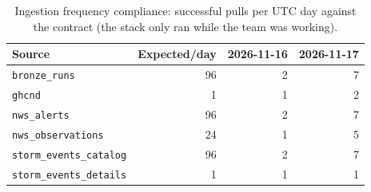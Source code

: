 \begin{table}[H]\centering\footnotesize
\caption{Ingestion frequency compliance: successful pulls per UTC day against the contract (the stack only ran while the team was working).}\label{tab:goving}
\begin{tabular}{@{}lrrr@{}}\toprule
Source & Expected/day & 2026-11-16 & 2026-11-17\\\midrule
\texttt{bronze\_runs} & 96 & 2 & 7\\
\texttt{ghcnd} & 1 & 1 & 2\\
\texttt{nws\_alerts} & 96 & 2 & 7\\
\texttt{nws\_observations} & 24 & 1 & 5\\
\texttt{storm\_events\_catalog} & 96 & 2 & 7\\
\texttt{storm\_events\_details} & 1 & 1 & 1\\
\bottomrule\end{tabular}\end{table}